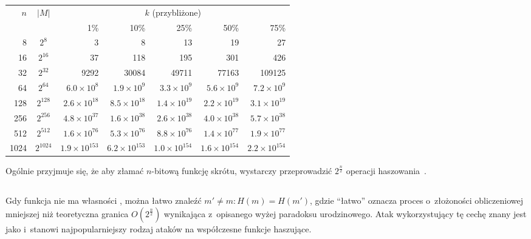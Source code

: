 \begin{tabular}{|r|c|*{5}{r|}}
\hline
\multirow{2}{*}{$n$} & \multirow{2}{*}{$|M|$} & \multicolumn{5}{c|}{$k$ (przybliżone)} \\
\cline{3-7}
& & 1\% & 10\% & 25\% & 50\% & 75\% \\
\hline
   8 &    $2^{8}$ & 3                     & 8                     & 13                    & 19                    & 27 \\
  16 &   $2^{16}$ & 37                    & 118                   & 195                   & 301                   & 426 \\
  32 &   $2^{32}$ & 9292                  & 30084                 & 49711                 & 77163                 & 109125 \\
  64 &   $2^{64}$ & $6.0 \times 10^{8}$   & $1.9 \times 10^{9}$   & $3.3 \times 10^{9}$   & $5.6 \times 10^{9}$   & $7.2 \times 10^{9}$ \\
 128 &  $2^{128}$ & $2.6 \times 10^{18}$  & $8.5 \times 10^{18}$  & $1.4 \times 10^{19}$  & $2.2 \times 10^{19}$  & $3.1 \times 10^{19}$ \\
 256 &  $2^{256}$ & $4.8 \times 10^{37}$  & $1.6 \times 10^{38}$  & $2.6 \times 10^{38}$  & $4.0 \times 10^{38}$  & $5.7 \times 10^{38}$ \\
 512 &  $2^{512}$ & $1.6 \times 10^{76}$  & $5.3 \times 10^{76}$  & $8.8 \times 10^{76}$  & $1.4 \times 10^{77}$  & $1.9 \times 10^{77}$ \\
1024 & $2^{1024}$ & $1.9 \times 10^{153}$ & $6.2 \times 10^{153}$ & $1.0 \times 10^{154}$ & $1.6 \times 10^{154}$ & $2.2 \times 10^{154}$ \\
\hline
\end{tabular}

\pagebreak
Ogólnie przyjmuje się, że aby złamać $n$-bitową funkcję skrótu, wystarczy
przeprowadzić $2^\frac{n}{2}$ operacji haszowania~\cite{birthday3}.



\subsection{}
Gdy funkcja nie ma własności , można łatwo znaleźć $m'
\neq m : H(m) = H(m')$, gdzie ``łatwo'' oznacza proces o~złożoności
obliczeniowej mniejszej niż teoretyczna granica $O(2^\frac{n}{2})$
wynikająca z~opisanego wyżej paradoksu urodzinowego. Atak wykorzystujący tę
cechę znany jest jako  i~stanowi najpopularniejszy
rodzaj ataków na współczesne funkcje haszujące.

